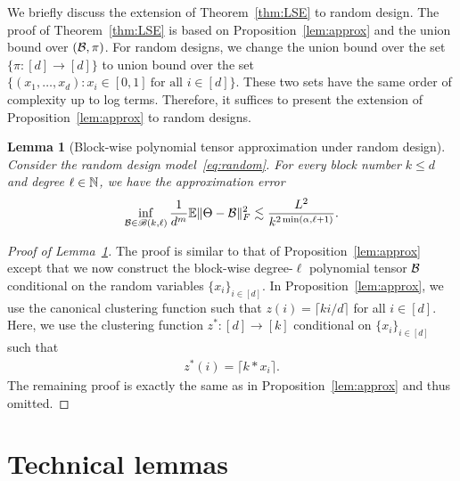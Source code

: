 \documentclass[12pt]{article}
\newtheorem{lem}{Lemma}
\theoremstyle{definition}
\def\caliB{\mathscr{B}}
\begin{document}
{    

We briefly discuss the extension of Theorem~\ref{thm:LSE} to random design. The proof of Theorem~\ref{thm:LSE} is based on Proposition~\ref{lem:approx} and the union bound over $(\mathcal{B}, \pi)$. For random designs, we change the union bound over the set $\{\pi\colon [d]\to[d]\}$ to union bound over the set $\{(x_1,\ldots,x_d): x_i\in[0,1] \ \text{for all }i\in[d]\}$. These two sets have the same order of complexity up to log terms. Therefore, it suffices to present the extension of Proposition~\ref{lem:approx} to random designs. 
 
 
\begin{lem}[Block-wise polynomial tensor approximation under  random design]\label{lem:approx_random}
  Consider the random design model~\eqref{eq:random}. For every block number $k\leq d$ and degree $\ell\in \mathbb{N}$, we have the approximation error
    \begin{align}
        \inf_{\tB\in\caliB(k,\ell)} \frac{1}{d^m}\mathbb{E}\FnormSize{}{\Theta-\tB}^2\lesssim \frac{L^2}{k^{2\min(\alpha,\ell+1)}}.
    \end{align}
    \end{lem}
    \begin{proof}[Proof of Lemma~\ref{lem:approx_random}]
    The proof is similar to that of Proposition~\ref{lem:approx} except that we now construct the block-wise degree-$\ell$ polynomial tensor $\mathcal{B}$ conditional on the random variables $\{x_i\}_{i\in[d]}$. In Proposition~\ref{lem:approx}, we use the canonical clustering function such that $z(i)=\lceil ki /d\rceil$ for all $i\in[d]$. Here, we use the clustering function $z^*\colon[d]\rightarrow[k]$ conditional on $\{x_i\}_{i\in[d]}$ such that
    \begin{align}
        z^*(i) = \lceil k*x_i\rceil.
    \end{align}
The remaining proof is exactly the same as in Proposition~\ref{lem:approx} and thus omitted. 
        \end{proof}   
    }

\section{Technical lemmas}\label{sec:tech}
\end{document}

